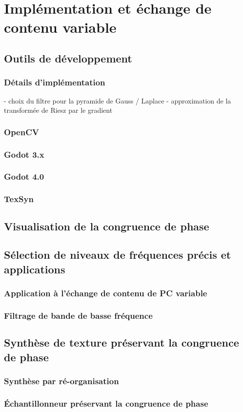 \chapter{Implémentation et échange de contenu variable}
\label{chap:chapitre4}

\section{Outils de développement}

\subsection{Détails d'implémentation}
- choix du filtre pour la pyramide de Gauss / Laplace
- approximation de la transformée de Riesz par le gradient

\subsection{OpenCV}
\subsection{Godot 3.x}
\subsection{Godot 4.0}
\subsection{TexSyn}

\section{Visualisation de la congruence de phase}

\section{Sélection de niveaux de fréquences précis et applications}

\subsection{Application à l'échange de contenu de PC variable}

\subsection{Filtrage de bande de basse fréquence}

\section{Synthèse de texture préservant la congruence de phase}

\subsection{Synthèse par ré-organisation}

\subsection{Échantillonneur préservant la congruence de phase}